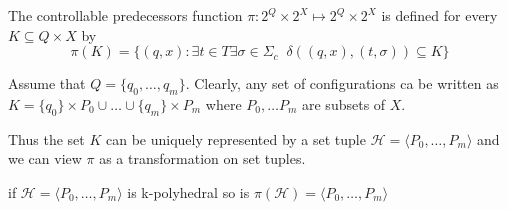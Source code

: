 \documentclass[table]{beamer}
\newcommand{\conf}{\ensuremath{(q,x)}}
\begin{document}
\begin{frame}
	\begin{dfn}
		The controllable predecessors function $\pi:2^Q \times 2^X \mapsto 2^Q \times 2^X$ is defined for every $K \subseteq Q \times X$ by
		$$\pi(K) =\{\conf : \exists t \in T \exists \sigma \in \Sigma_c\;\;\delta(\conf,(t,\sigma)) \subseteq K\}$$
	\end{dfn}
\end{frame}

\begin{frame}
	Assume that $Q = \{q_0,\ldots,q_m\}$. Clearly, any set of configurations ca be written as $ K=\{q_0\} \times P_0 \cup \ldots \cup \{q_m\} \times P_m$ where $P_0,\dots P_m$ are subsets of $X$.

	\medskip

	Thus the set $K$ can be uniquely represented by a set tuple $\mathcal{H} = \langle P_0, \ldots, P_m\rangle$ and we can view $\pi$ as a transformation on set tuples.
\end{frame}

\begin{frame}
	\begin{thm}
		if $\mathcal{H} = \langle P_0, \ldots, P_m\rangle$ is k-polyhedral so is $\pi(\mathcal{H}) = \langle P_0, \ldots, P_m\rangle$
	\end{thm}
\end{frame}
\end{document}
